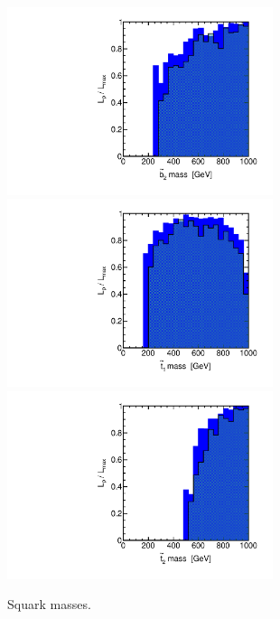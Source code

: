 \begin{figure}[htbp]
\begin{center}
\includegraphics[height=5.5cm]{figs/fig_b_2.pdf} \\
\includegraphics[height=5.5cm]{figs/fig_t_1.pdf} 
\includegraphics[height=5.5cm]{figs/fig_t_2.pdf} \\
\caption{Squark masses.}
\label{default}
\end{center}
\end{figure}



